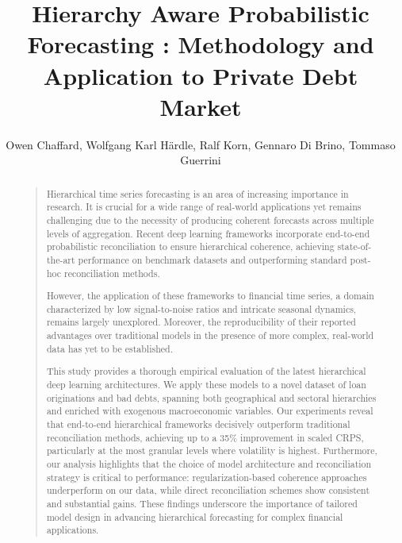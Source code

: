 \documentclass[letterpaper]{article}
\begin{document}

\title{Hierarchy Aware Probabilistic Forecasting : Methodology and Application to Private Debt Market}
\author{Owen Chaffard, Wolfgang Karl Härdle, Ralf Korn, Gennaro Di Brino, Tommaso Guerrini}
\maketitle
\begin{abstract}
\begin{quote}

Hierarchical time series forecasting is an area of increasing importance in research. 
It is crucial for a wide range of real-world applications yet remains challenging due to the necessity of producing coherent forecasts across multiple levels of aggregation.
Recent deep learning frameworks incorporate end-to-end probabilistic reconciliation to ensure hierarchical coherence, achieving state-of-the-art performance on benchmark datasets and outperforming standard post-hoc reconciliation methods. 

However, the application of these frameworks to financial time series, a domain characterized by low signal-to-noise ratios and intricate seasonal dynamics, remains largely unexplored. 
Moreover, the reproducibility of their reported advantages over traditional models in the presence of more complex, real-world data has yet to be established. 

This study provides a thorough empirical evaluation of the latest hierarchical deep learning architectures. 
We apply these models to a novel dataset of loan originations and bad debts, spanning both geographical and sectoral hierarchies and enriched with exogenous macroeconomic variables. 
Our experiments reveal that end-to-end hierarchical frameworks decisively outperform traditional reconciliation methods, achieving up to a 35\% improvement in scaled CRPS, particularly at the most granular levels where volatility is highest.
Furthermore, our analysis highlights that the choice of model architecture and reconciliation strategy is critical to performance: regularization-based coherence approaches underperform on our data, while direct reconciliation schemes show consistent and substantial gains.
These findings underscore the importance of tailored model design in advancing hierarchical forecasting for complex financial applications. 


\end{quote}
\end{abstract}
\end{document}
